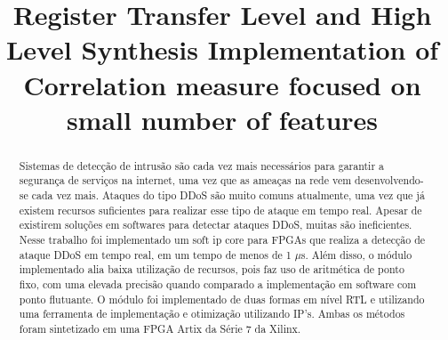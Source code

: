 \documentclass[conference]{IEEEtran}
\begin{document}
	
\title{Register Transfer Level and High Level Synthesis Implementation of Correlation measure focused on small number of features\\
	}

\author{
	\and
	\and
	
}

\maketitle
	\begin{abstract}
					
	Sistemas de detecção de intrusão são cada vez mais necessários para garantir a segurança
	de serviços na internet, uma vez que as ameaças na rede vem desenvolvendo-se cada
	vez mais. Ataques do tipo DDoS são muito comuns atualmente, uma vez que já existem
	recursos suficientes para realizar esse tipo de ataque em tempo real. Apesar de existirem
	soluções em softwares para detectar ataques DDoS, muitas são ineficientes. Nesse trabalho
	foi implementado um soft ip core para FPGAs que realiza a detecção de ataque DDoS
	em tempo real, em um tempo de menos de 1 $\mu$s. Além disso, o módulo implementado alia
	baixa utilização de recursos, pois faz uso de aritmética de ponto fixo, com uma elevada
	precisão quando comparado a implementação em software com ponto flutuante. O módulo
	foi implementado de duas formas em nível RTL e utilizando uma ferramenta de implementação e otimização utilizando IP's. Ambas os métodos foram sintetizado em uma FPGA Artix da Série 7 da Xilinx.
		
	\end{abstract}
	
\end{document}
